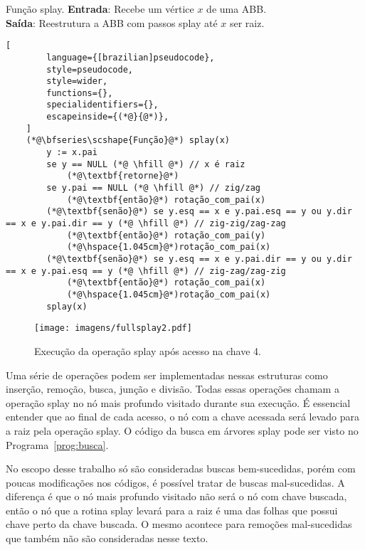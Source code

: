 \begin{programruledcaption}{Função splay.\label{prog:splay}}
    \noindent\textbf{Entrada}: Recebe um vértice $x$ de uma ABB.\\
    \textbf{Saída}: Reestrutura a ABB com passos splay até $x$ ser raiz. 
    \vspace{-0.5\baselineskip}
    \begin{lstlisting}[
        language={[brazilian]pseudocode},
        style=pseudocode,
        style=wider,
        functions={},
        specialidentifiers={},
        escapeinside={(*@}{@*)},
    ]
    (*@\bfseries\scshape{Função}@*) splay(x)
        y := x.pai
        se y == NULL (*@ \hfill @*) // x é raiz
            (*@\textbf{retorne}@*)
        se y.pai == NULL (*@ \hfill @*) // zig/zag
            (*@\textbf{então}@*) rotação_com_pai(x)
        (*@\textbf{senão}@*) se y.esq == x e y.pai.esq == y ou y.dir == x e y.pai.dir == y (*@ \hfill @*) // zig-zig/zag-zag
            (*@\textbf{então}@*) rotação_com_pai(y)
            (*@\hspace{1.045cm}@*)rotação_com_pai(x)
        (*@\textbf{senão}@*) se y.esq == x e y.pai.dir == y ou y.dir == x e y.pai.esq == y (*@ \hfill @*) // zig-zag/zag-zig
            (*@\textbf{então}@*) rotação_com_pai(x)
            (*@\hspace{1.045cm}@*)rotação_com_pai(x)
        splay(x)
    \end{lstlisting}
    \vspace{-0.5\baselineskip}
\end{programruledcaption}

\begin{figure}
    \texttt{[image: imagens/fullsplay2.pdf]}
    \caption{Execução da operação splay após acesso na chave 4.}
\label{fig:fullsplay}
\end{figure}

Uma série de operações podem ser implementadas nessas estruturas como inserção, remoção, busca, junção e divisão. Todas essas operações chamam a operação splay no nó mais profundo visitado durante sua execução. É essencial entender que ao final de cada acesso, o nó com a chave acessada será levado para a raiz pela operação splay. O código da busca em árvores splay pode ser visto no Programa~\ref{prog:busca}.

No escopo desse trabalho só são consideradas buscas bem-sucedidas, porém com poucas modificações nos códigos, é possível tratar de buscas mal-sucedidas. A diferença é que o nó mais profundo visitado não será o nó com chave buscada, então o nó que a rotina splay levará para a raiz é uma das folhas que possui chave perto da chave buscada. O mesmo acontece para remoções mal-sucedidas que também não são consideradas nesse texto.

